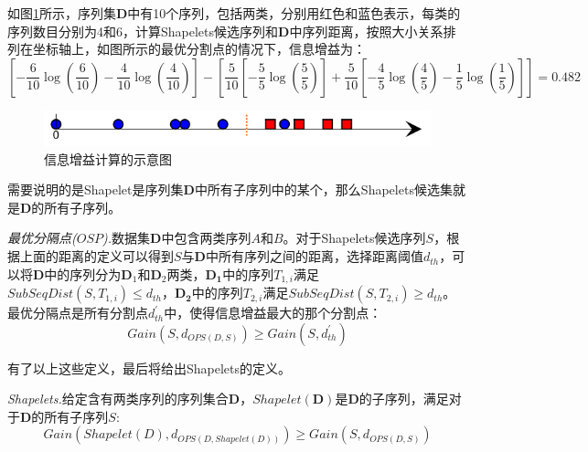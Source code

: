如图\ref{equ:entropy}所示，序列集$\bm{D}$中有10个序列，包括两类，分别用红色和蓝色表示，每类的序列数目分别为4和6，计算Shapelets候选序列和$\bm{D}$中序列距离，按照大小关系排列在坐标轴上，如图所示的最优分割点的情况下，信息增益为：
\begin{equation}\label{equ:entropy}
  \left[ { - \frac{6}{{10}}\log \left( {\frac{6}{{10}}} \right) - \frac{4}{{10}}\log \left( {\frac{4}{{10}}} \right)} \right] - \left[ {\frac{5}{{10}}\left[ { - \frac{5}{5}\log \left( {\frac{5}{5}} \right)} \right] + \frac{5}{{10}}\left[ { - \frac{4}{5}\log \left( {\frac{4}{5}} \right) - \frac{1}{5}\log \left( {\frac{1}{5}} \right)} \right]} \right] = 0.482
\end{equation}
\begin{figure}
  \centering
  \includegraphics[width=0.8\linewidth]{./figure/entropy.PNG}
  \caption{信息增益计算的示意图}\label{equ:entropy}
\end{figure}

需要说明的是Shapelet是序列集$\bm{D}$中所有子序列中的某个，那么Shapelets候选集就是$\bm{D}$的所有子序列。

\begin{mydef}
    \emph{最优分隔点($OSP$).}数据集$\bm{D}$中包含两类序列$A$和$B$。对于Shapelets候选序列$S$，根据上面的距离的定义可以得到$S$与$\bm{D}$中所有序列之间的距离，选择距离阈值$d_{th}$，可以将$\bm{D}$中的序列分为$\bm{D}_1$和$\bm{D}_2$两类，$\bm{D_1}$中的序列$T_{1,i}$满足$SubSeqDist(S,T_{1,i}) \le d_{th}$，$\bm{D_2}$中的序列$T_{2,i}$满足$SubSeqDist(S,T_{2,i}) \ge d_{th}$。最优分隔点是所有分割点$d_{th}^{'}$中，使得信息增益最大的那个分割点：
    \begin{equation}\label{equ:12}
      Gain\left( {S,{d_{OPS\left( {D,S} \right)}}} \right) \ge Gain\left( {S,d_{th}^{'}} \right)
    \end{equation}
\end{mydef}

有了以上这些定义，最后将给出Shapelets的定义。

\begin{mydef}
    \emph{Shapelets.}给定含有两类序列的序列集合$\bm{D}$，$Shapelet(\bm{D})$是$\bm{D}$的子序列，满足对于$\bm{D}$的所有子序列$S$:
    \begin{equation}\label{equ:13}
        Gain\left( {Shapelet\left( D \right),{d_{OPS\left( {D,Shapelet\left( D \right)} \right)}}} \right) \ge Gain\left( {S,{d_{OPS\left( {D,S} \right)}}} \right)
    \end{equation}
\end{mydef}

